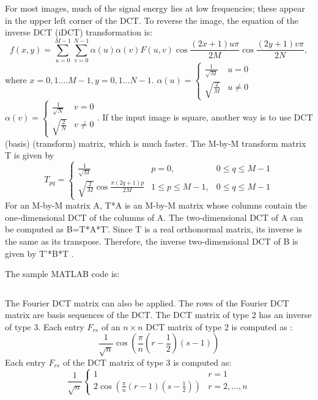 \documentclass[a4paper,12pt,twoside]{article}
\begin{document}
For most images, much of the signal energy lies at low frequencies; these appear in the upper left corner of the DCT. To reverse the image, the equation of the inverse DCT (iDCT) transformation is:
\begin{equation}
    f(x,y)=\sum_{u=0}^{M-1}{\sum_{v=0}^{N-1}{\alpha(u)\alpha(v)F(u,v)\cos{\frac{(2x+1)u\pi}{2M}}\cos{\frac{(2y+1)v\pi}{2N}}}},
\end{equation}
where $x=0,1\dots.M-1,y=0,1\dots N-1$. $\alpha(u)=\left\{\begin{array}{ll}\frac{1}{\sqrt{M}}&u=0\\\sqrt{\frac{2}{M}}&u\neq0\end{array}\right.$ $\alpha(v)=\left\{\begin{array}{ll}\frac{1}{\sqrt{N}}&v=0\\\sqrt{\frac{2}{N}}&v\neq0\end{array}\right.$.
If the input image is square, another way is to use DCT (basis) (transform) matrix, which is much faster. The M-by-M transform matrix T is given by
\begin{equation}
    T_{pq}=\left\{\begin{array}{lll}\frac{1}{\sqrt{M}}&p=0,&0\leq q\leq M-1\\\sqrt{\frac{2}{M}}\cos{\frac{\pi(2q+1)p}{2M}}&1\leq p\leq M-1,&0\leq q\leq M-1\end{array}\right.
\end{equation}
For an M-by-M matrix A, T*A is an M-by-M matrix whose columns contain the one-dimensional DCT of the columns of A. The two-dimensional DCT of A can be computed as B=T*A*T'. Since T is a real orthonormal matrix, its inverse is the same as its transpose. Therefore, the inverse two-dimensional DCT of B is given by T'*B*T \cite{dctdoc}.

The sample MATLAB code is:
\inputminted{matlab}{compression_test.m}

The Fourier DCT matrix can also be applied. The rows of the Fourier DCT matrix are basis sequences of the DCT. The DCT matrix of type 2 has an inverse of type 3. Each entry $F_{rs}$ of an $n\times n$ DCT matrix of type 2 is computed as \cite{fdctmdoc}:
\begin{equation}
    \frac{1}{\sqrt{n}}\cos{\left(\frac{\pi}{n}\left(r-\frac{1}{2}\right)\left(s-1\right)\right)}
\end{equation}
Each entry $F_{rs}$ of the DCT matrix of type 3 is computed as:
\begin{equation}
    \frac{1}{\sqrt{n}}\left\{\begin{array}{ll}1&r=1\\2\cos{\left(\frac{\pi}{n}\left(r-1\right)\left(s-\frac{1}{2}\right)\right)}&r=2,\dots,n\end{array}\right.
\end{equation}
\end{document}

